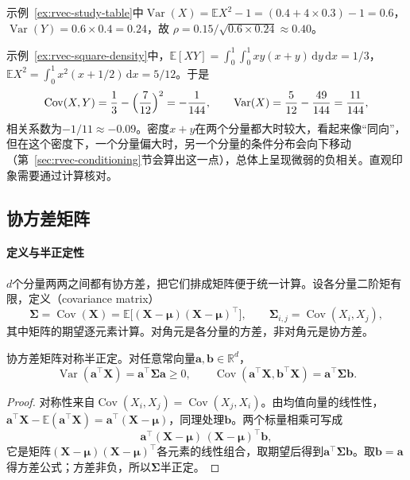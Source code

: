 \begin{example}[两个例子的相关系数]
\label{ex:rvec-correlation-values}
示例~\ref{ex:rvec-study-table}中$\operatorname{Var}(X)=\mathbb EX^2-1=(0.4+4\times0.3)-1=0.6$，$\operatorname{Var}(Y)=0.6\times0.4=0.24$，故
$\rho=0.15/\sqrt{0.6\times0.24}\approx0.40$。

示例~\ref{ex:rvec-square-density}中，$\mathbb E[XY]=\int_0^1\!\int_0^1xy(x+y)\,\mathrm dy\,\mathrm dx=1/3$，$\mathbb EX^2=\int_0^1x^2(x+1/2)\,\mathrm dx=5/12$。于是
\[
 \operatorname{Cov}(X,Y)=\frac13-\Bigl(\frac7{12}\Bigr)^2=-\frac1{144},\qquad
 \operatorname{Var}(X)=\frac5{12}-\frac{49}{144}=\frac{11}{144},
\]
相关系数为$-1/11\approx-0.09$。密度$x+y$在两个分量都大时较大，看起来像“同向”，但在这个密度下，一个分量偏大时，另一个分量的条件分布会向下移动（第~\ref{sec:rvec-conditioning}节会算出这一点），总体上呈现微弱的负相关。直观印象需要通过计算核对。
\end{example}

\subsection{协方差矩阵}
\label{sec:rvec-covariance-matrix}

\paragraph{定义与半正定性}
$d$个分量两两之间都有协方差，把它们排成矩阵便于统一计算。设各分量二阶矩有限，定义（covariance matrix）
\[
 \bm\Sigma=\operatorname{Cov}(\bm X)=\mathbb E\bigl[(\bm X-\bm\mu)(\bm X-\bm\mu)^{\top}\bigr],
 \qquad \bm\Sigma_{i,j}=\operatorname{Cov}(X_i,X_j),
\]
其中矩阵的期望逐元素计算。对角元是各分量的方差，非对角元是协方差。

\begin{theorem}[协方差矩阵的性质]
\label{thm:rvec-covariance-psd}
协方差矩阵对称半正定。对任意常向量$\bm a,\bm b\in\mathbb R^d$，
\[
 \operatorname{Var}(\bm a^{\top}\bm X)=\bm a^{\top}\bm\Sigma\bm a\ge0,\qquad
 \operatorname{Cov}(\bm a^{\top}\bm X,\bm b^{\top}\bm X)=\bm a^{\top}\bm\Sigma\bm b .
\]
\end{theorem}

\begin{proof}
对称性来自$\operatorname{Cov}(X_i,X_j)=\operatorname{Cov}(X_j,X_i)$。由均值向量的线性性，$\bm a^{\top}\bm X-\mathbb E(\bm a^{\top}\bm X)=\bm a^{\top}(\bm X-\bm\mu)$，同理处理$\bm b$。两个标量相乘可写成
\[
 \bm a^{\top}(\bm X-\bm\mu)\,(\bm X-\bm\mu)^{\top}\bm b ,
\]
它是矩阵$(\bm X-\bm\mu)(\bm X-\bm\mu)^{\top}$各元素的线性组合，取期望后得到$\bm a^{\top}\bm\Sigma\bm b$。取$\bm b=\bm a$得方差公式；方差非负，所以$\bm\Sigma$半正定。
\end{proof}

